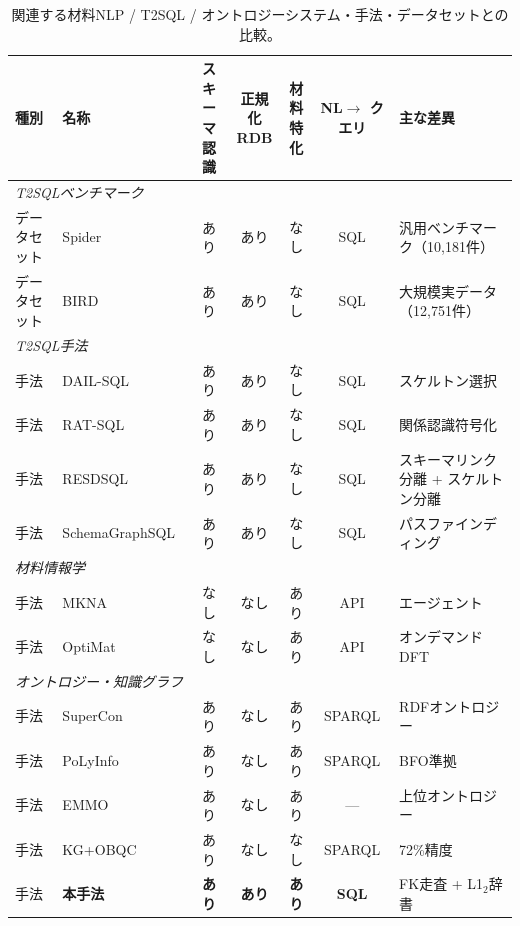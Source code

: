 \documentclass[5p,twocolumn]{elsarticle}
\begin{document}
\begin{table}[htbp]
  \centering
  \caption{関連する材料NLP / T2SQL / オントロジーシステム・手法・データセットとの比較。}
  \label{tab:related_comparison}
  \small
  \begin{tabularx}{\textwidth}{llccccX}
    \toprule
    種別 & 名称 & \shortstack{スキーマ\\認識} & \shortstack{正規化\\RDB} & \shortstack{材料\\特化} & \shortstack{NL$\to$\\クエリ} & 主な差異 \\
    \midrule
    \multicolumn{7}{l}{\textit{T2SQLベンチマーク}} \\
    データセット & Spider~\citep{yu2018spider} & あり & あり & なし & SQL & 汎用ベンチマーク（10{,}181件） \\
    データセット & BIRD~\citep{li2024bird} & あり & あり & なし & SQL & 大規模実データ（12{,}751件） \\
    \midrule
    \multicolumn{7}{l}{\textit{T2SQL手法}} \\
    手法 & DAIL-SQL~\citep{gao2023dail} & あり & あり & なし & SQL & スケルトン選択 \\
    手法 & RAT-SQL~\citep{wang2020ratsql} & あり & あり & なし & SQL & 関係認識符号化 \\
    手法 & RESDSQL~\citep{li2023resdsql} & あり & あり & なし & SQL & スキーマリンク分離 + スケルトン分離 \\
    手法 & SchemaGraphSQL~\citep{safdarian2026schemagraphsql} & あり & あり & なし & SQL & パスファインディング \\
    \midrule
    \multicolumn{7}{l}{\textit{材料情報学}} \\
    手法 & MKNA~\citep{zhuang2026mkna} & なし & なし & あり & API & エージェント \\
    手法 & OptiMat~\citep{hu2026optimat} & なし & なし & あり & API & オンデマンドDFT \\
    \midrule
    \multicolumn{7}{l}{\textit{オントロジー・知識グラフ}} \\
    手法 & SuperCon~\citep{ishii2023supercon} & あり & なし & あり & SPARQL & RDFオントロジー \\
    手法 & PoLyInfo~\citep{ishii2024polyinfo} & あり & なし & あり & SPARQL & BFO準拠 \\
    手法 & EMMO~\citep{emmo2020} & あり & なし & あり & --- & 上位オントロジー \\
    手法 & KG+OBQC~\citep{allemang2024obqc} & あり & なし & なし & SPARQL & 72\%精度 \\
    \midrule
    手法 & \textbf{本手法} & \textbf{あり} & \textbf{あり} & \textbf{あり} & \textbf{SQL} & FK走査 + L1$_2$辞書 \\
    \bottomrule
  \end{tabularx}
\end{table}
\end{document}
